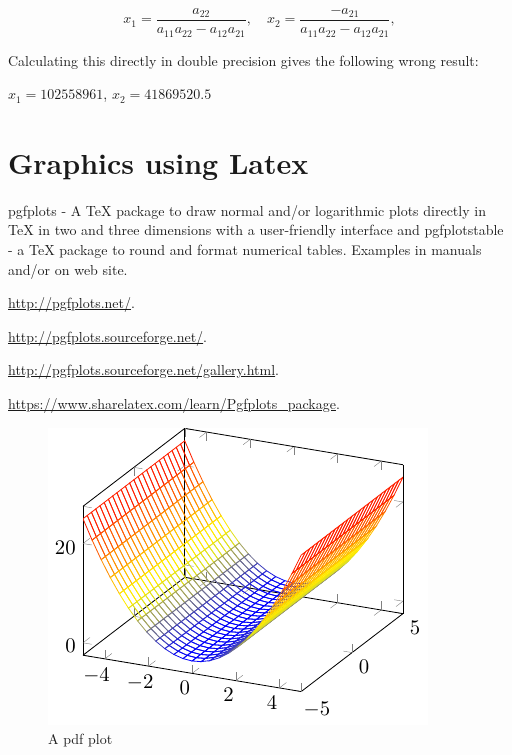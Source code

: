 \begin{equation}
x_1 = \frac{a_{22}}{a_{11}a_{22} - a_{12}a_{21}}, \quad x_2 = \frac{-a_{21}}{a_{11}a_{22} - a_{12}a_{21}},
\end{equation}

Calculating this directly in double precision gives the following wrong result:  

$x_1 = 102558961$, $x_2 = 41869520.5$

%





\newpage
\section{Graphics using Latex}
\label{Tutorial: GraphicsLatex}


pgfplots \citep{Feuersanger_2014} - A TeX package to draw normal and/or logarithmic plots directly in TeX in two and three dimensions with a user-friendly interface and pgfplotstable - a TeX package to round and format numerical tables. Examples in manuals and/or on web site.

\vpara
\href{http://pgfplots.net/}{http://pgfplots.net/}. 


\vpara
\href{http://pgfplots.sourceforge.net/}{http://pgfplots.sourceforge.net/}. 

\vpara
\href{http://pgfplots.sourceforge.net/gallery.html}{http://pgfplots.sourceforge.net/gallery.html}. 

\vpara
\href{https://www.sharelatex.com/learn/Pgfplots\_package}{https://www.sharelatex.com/learn/Pgfplots\_package}. 



\begin{figure}[ht]
	\centering
	\includegraphics{figures/3Dplot.pdf}
	\caption{A pdf plot}
	\label{Fig pdf of the Distribution of the Sample Correlation Coefficient}
\end{figure}



